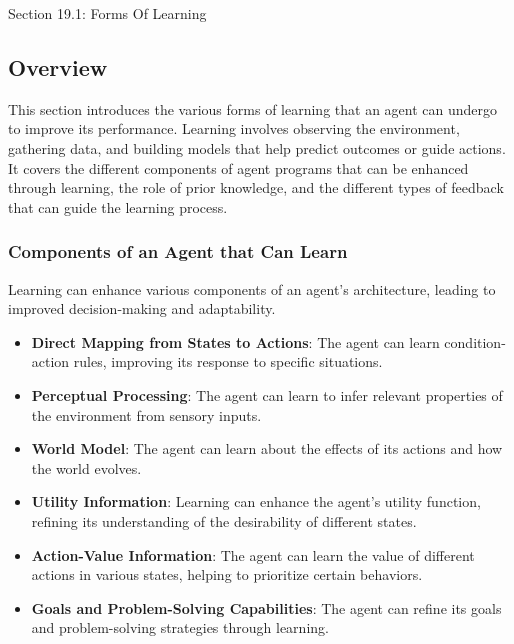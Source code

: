 \begin{notes}{Section 19.1: Forms Of Learning}
    \subsection*{Overview}

    This section introduces the various forms of learning that an agent can undergo to improve its performance. Learning involves observing the environment, gathering data, and building models that help 
    predict outcomes or guide actions. It covers the different components of agent programs that can be enhanced through learning, the role of prior knowledge, and the different types of feedback that 
    can guide the learning process.
    
    \subsubsection*{Components of an Agent that Can Learn}
    
    Learning can enhance various components of an agent's architecture, leading to improved decision-making and adaptability.
    
    \begin{highlight}
    
        \begin{itemize}
            \item \textbf{Direct Mapping from States to Actions}: The agent can learn condition-action rules, improving its response to specific situations.
            \item \textbf{Perceptual Processing}: The agent can learn to infer relevant properties of the environment from sensory inputs.
            \item \textbf{World Model}: The agent can learn about the effects of its actions and how the world evolves.
            \item \textbf{Utility Information}: Learning can enhance the agent's utility function, refining its understanding of the desirability of different states.
            \item \textbf{Action-Value Information}: The agent can learn the value of different actions in various states, helping to prioritize certain behaviors.
            \item \textbf{Goals and Problem-Solving Capabilities}: The agent can refine its goals and problem-solving strategies through learning.
        \end{itemize}
    

\end{highlight}
\end{notes}
